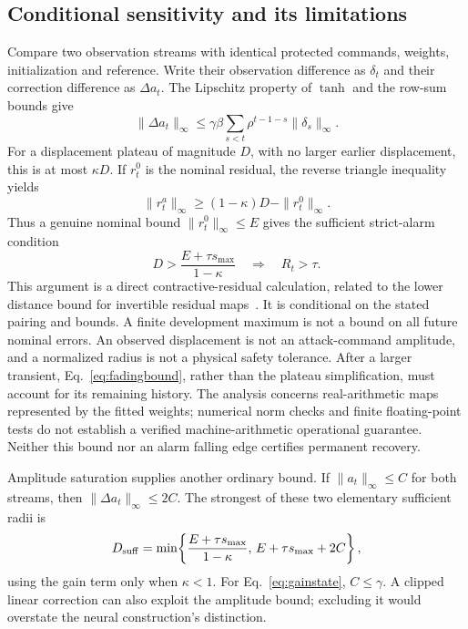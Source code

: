 \subsection{Conditional sensitivity and its limitations}
Compare two observation streams with identical protected commands, weights, initialization and reference. Write their observation difference as $\delta_t$ and their correction difference as $\Delta a_t$. The Lipschitz property of $\tanh$ and the row-sum bounds give
\begin{equation}
 \|\Delta a_t\|_\infty\leq\gamma\beta
 \sum_{s<t}\rho^{t-1-s}\|\delta_s\|_\infty.
 \label{eq:fadingbound}
\end{equation}
For a displacement plateau of magnitude $D$, with no larger earlier displacement, this is at most $\kappa D$. If $r_t^0$ is the nominal residual, the reverse triangle inequality yields
\begin{equation}
 \|r_t^a\|_\infty\geq (1-\kappa)D-\|r_t^0\|_\infty.
 \label{eq:plateaubound}
\end{equation}
Thus a genuine nominal bound $\|r_t^0\|_\infty\leq E$ gives the sufficient strict-alarm condition
\begin{equation}
 D>\frac{E+\tau s_{\max}}{1-\kappa}\quad\Longrightarrow\quad R_t>\tau.
 \label{eq:gainradius}
\end{equation}
This argument is a direct contractive-residual calculation, related to the lower distance bound for invertible residual maps~\cite{iresnet}. It is conditional on the stated pairing and bounds. A finite development maximum is not a bound on all future nominal errors. An observed displacement is not an attack-command amplitude, and a normalized radius is not a physical safety tolerance. After a larger transient, Eq.~\eqref{eq:fadingbound}, rather than the plateau simplification, must account for its remaining history. The analysis concerns real-arithmetic maps represented by the fitted weights; numerical norm checks and finite floating-point tests do not establish a verified machine-arithmetic operational guarantee. Neither this bound nor an alarm falling edge certifies permanent recovery.

Amplitude saturation supplies another ordinary bound. If $\|a_t\|_\infty\leq C$ for both streams, then $\|\Delta a_t\|_\infty\leq2C$. The strongest of these two elementary sufficient radii is
\begin{equation}
 D_{\rm suff}=\min\!\left\{
 \frac{E+\tau s_{\max}}{1-\kappa},\,
 E+\tau s_{\max}+2C\right\},
 \label{eq:capradius}
\end{equation}
using the gain term only when $\kappa<1$. For Eq.~\eqref{eq:gainstate}, $C\leq\gamma$. A clipped linear correction can also exploit the amplitude bound; excluding it would overstate the neural construction's distinction.

